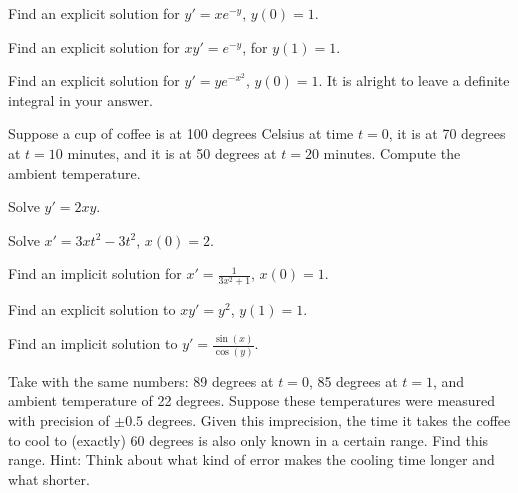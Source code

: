 \begin{exercise}
Find an explicit solution for $y' = xe^{-y}$, $y(0)=1$.
\end{exercise}

\begin{exercise}
Find an explicit solution for $xy' = e^{-y}$, for $y(1)=1$.
\end{exercise}

\begin{exercise}
Find an explicit solution for $y' = ye^{-x^2}$, $y(0)=1$.  It is alright to
leave a definite integral in your answer.
\end{exercise}

\begin{exercise}
Suppose a cup of coffee is at 100 degrees Celsius at time $t=0$,
it is at 70 degrees at $t=10$ minutes, and it is at 50 degrees at $t=20$
minutes.  Compute the ambient temperature.
\end{exercise}

\setcounter{exercise}{100}

\begin{exercise}
Solve $y'=2xy$.
\end{exercise}

\begin{exercise}
Solve $x'=3xt^2-3t^2$, $x(0)=2$.
\end{exercise}

\begin{exercise}
Find an implicit solution for
$x'=\frac{1}{3x^2+1}$, $x(0)=1$.
\end{exercise}

\begin{exercise}
Find an explicit solution to $x y' = y^2$, $y(1) = 1$.
\end{exercise}

\begin{exercise}
Find an implicit solution to $y' = \frac{\sin(x)}{\cos(y)}$.
\end{exercise}

\begin{exercise}
Take  with the same numbers: 89 degrees at
$t=0$, 85 degrees at $t=1$, and ambient temperature
of 22 degrees.  Suppose these temperatures were measured with precision of
$\pm 0.5$ degrees.  Given this imprecision, the time
it takes the coffee to cool to (exactly) 60 degrees is also only known in a
certain range.  Find this range.  Hint: Think about what kind of error makes
the cooling time longer and what shorter.
\end{exercise}

